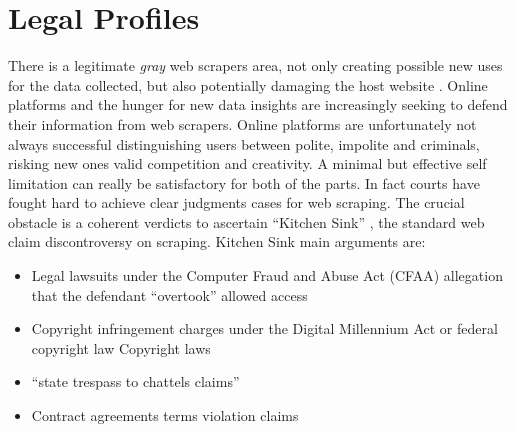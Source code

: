 \documentclass[
  12pt,
  a4paper,
  oneside]{book}
\providecommand{\tightlist}{%
  \setlength{\itemsep}{0pt}\setlength{\parskip}{0pt}}
\theoremstyle{definition}
\theoremstyle{definition}
\theoremstyle{definition}
\theoremstyle{remark}
\begin{document}
\hypertarget{legal}{%
\section{Legal Profiles}\label{legal}}

There is a legitimate \emph{gray} web scrapers area, not only creating possible new uses for the data collected, but also potentially damaging the host website \citep{WhatCour57}. Online platforms and the hunger for new data insights are increasingly seeking to defend their information from web scrapers. Online platforms are unfortunately not always successful distinguishing users between polite, impolite and criminals, risking new ones valid competition and creativity. A minimal but effective self limitation can really be satisfactory for both of the parts.
In fact courts have fought hard to achieve clear judgments cases for web scraping. The crucial obstacle is a coherent verdicts to ascertain ``Kitchen Sink'' \citep{zamora2019making}, the standard web claim discontroversy on scraping. Kitchen Sink main arguments are:

\begin{itemize}
\tightlist
\item
  Legal lawsuits under the Computer Fraud and Abuse Act (CFAA) allegation that the defendant ``overtook'' allowed access \citep{UnitedSt65}
\item
  Copyright infringement charges under the Digital Millennium Act or federal copyright law Copyright laws \citep{AuthorsG59}
\item
  ``state trespass to chattels claims'' \citep{Register77}
\item
  Contract agreements terms violation claims \citeyearpar{Register77}
\end{itemize}
\end{document}
